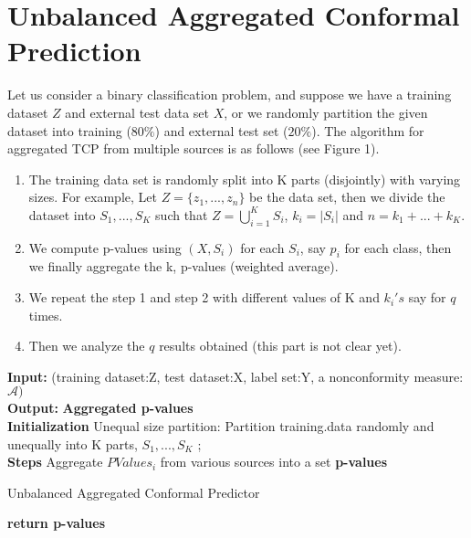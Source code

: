 \documentclass[main]{subfiles}
\begin{document}
\section{Unbalanced Aggregated Conformal Prediction}
Let us consider a binary classification problem, and suppose we have a training dataset $Z$ and  external test data set $X$, or we randomly partition the given dataset into training ($80\%$) and external test set ($20\%$). The algorithm for aggregated TCP from multiple sources is as follows (see Figure 1).
\begin{enumerate}

\item The training data set is randomly split into K parts (disjointly) with varying sizes. For example, Let $Z = \{ z_1 , ..., z_n \} $ be the data set, then we divide the dataset into $S_1, ..., S_K$ such that $Z = \bigcup_{i=1}^K S_i$, $k_i = |S_i|$ and $n = k_1+ ...+k_K$.

\item We compute p-values using  $(X,S_i)$ for each $S_i$, say $p_i$ for each class, then we finally aggregate the k, p-values (weighted average).  

\item We repeat the step 1 and step 2 with different values of K and $k_i's$ say for $q$ times.

\item  Then we analyze the $q$ results obtained (this part is not clear yet).

\end{enumerate}


 \begin{algorithm}[H]
 \textbf{Input:}{ (training dataset:Z, test dataset:X, label set:Y, a nonconformity measure:$\mathcal{A})$}\\
 \textbf{Output:}{\textbf{ Aggregated p-values} }\\
 \textbf{Initialization\;}
 Unequal size partition: Partition training.data randomly and unequally into K parts, $S_1, ..., S_K$ ;\\ %
 \textbf{Steps\;}
 Aggregate $PValues_i$ from various sources into a set \textbf{p-values}
 \caption{Unbalanced Aggregated Conformal Predictor}
 \textbf{return \textbf{p-values}}
 \end{algorithm}
 
\end{document}
